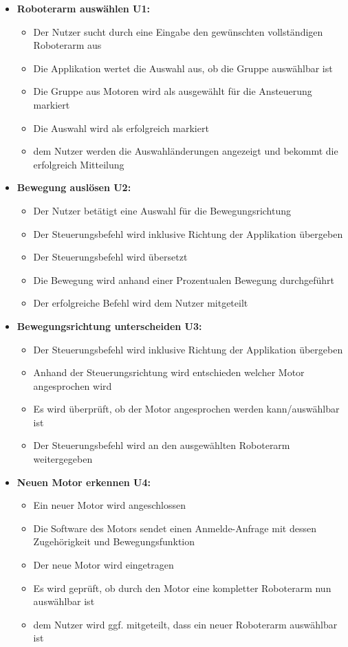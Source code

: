 \begin{itemize}
	\item \textbf{Roboterarm auswählen U1:}\\
	\begin{itemize}
		\item Der Nutzer sucht durch eine Eingabe den gewünschten vollständigen Roboterarm aus
		\item Die Applikation wertet die Auswahl aus, ob die Gruppe auswählbar ist
		\item Die Gruppe aus Motoren wird als ausgewählt für die Ansteuerung markiert
		\item Die Auswahl wird als erfolgreich markiert
		\item dem Nutzer werden die Auswahländerungen angezeigt und bekommt die erfolgreich Mitteilung
	\end{itemize}
	
	\item \textbf{Bewegung auslösen U2:}\\
	\begin{itemize}
		\item Der Nutzer betätigt eine Auswahl für die Bewegungsrichtung
		\item Der Steuerungsbefehl wird inklusive Richtung der Applikation übergeben
		\item Der Steuerungsbefehl wird übersetzt
		\item Die Bewegung wird anhand einer Prozentualen Bewegung durchgeführt
		\item Der erfolgreiche Befehl wird dem Nutzer mitgeteilt
	\end{itemize}
	
	\item \textbf{Bewegungsrichtung unterscheiden U3:}\\
	\begin{itemize}
		\item Der Steuerungsbefehl wird inklusive Richtung der Applikation übergeben
		\item Anhand der Steuerungsrichtung wird entschieden welcher Motor angesprochen wird
		\item Es wird überprüft, ob der Motor angesprochen werden kann/auswählbar ist
		\item Der Steuerungsbefehl wird an den ausgewählten Roboterarm weitergegeben
	\end{itemize}
	
	\item \textbf{Neuen Motor erkennen U4:}\\
	\begin{itemize}
		\item Ein neuer Motor wird angeschlossen
		\item Die Software des Motors sendet einen Anmelde-Anfrage mit dessen Zugehörigkeit und Bewegungsfunktion
		\item Der neue Motor wird eingetragen
		\item Es wird geprüft, ob durch den Motor eine kompletter Roboterarm nun auswählbar ist
		\item dem Nutzer wird ggf. mitgeteilt, dass ein neuer Roboterarm auswählbar ist
	\end{itemize}
	

\end{itemize}
